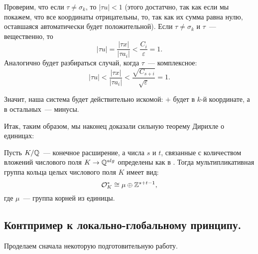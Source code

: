 	  Проверим, что если $\tau  \neq \sigma_k$, то $|\tau u| < 1$ (этого достатчно, так как если мы покажем, что все координаты отрицательны, то, так как их сумма равна нулю, оставшаяся автоматически будет положительной). Если  $\tau \neq \sigma_k$ и $\tau$~--- вещественно, то 
	  \[
	  	|\tau u| = \frac{|\tau x|}{|\tau a_i|} < \frac{C_i}{\varepsilon} = 1.
	  \]
	  Аналогично будет разбираться случай, когда $\tau$~--- комплексное: 
	  \[
	  	|\tau u| < \frac{|\tau x|}{|\tau a_i|} < \frac{\sqrt{C_{s + i}}}{\sqrt{\varepsilon}} = 1.
	  \]

	  Значит, наша система будет действительно искомой: $+$ будет в $k$-й координате, а в остальных~--- минусы. 

	  Итак, таким образом, мы наконец доказали сильную теорему Дирихле о единицах: 

	  \begin{theorem}
	  Пусть $K/\mathbb{Q}$~--- конечное расширение, а числа $s$ и $t$, связанные с количеством вложений числового поля $K \to \mathbb{Q}^{alg}$ определены как в \hyperlink{real_and_complex_inclusions}{}. Тогда мультипликативная группа кольца целых числового поля $K$ имеет вид: 
	  	\[ \mathcal{O}_{K}^{*} \cong \mu \oplus \mathbb{Z}^{s + t - 1}, \]
	  	где $\mu$~--- группа корней из единицы.
	  \end{theorem}

	  \subsection{Контпример к локально-глобальному принципу.}

	  Проделаем сначала некоторую подготовительную работу. 

